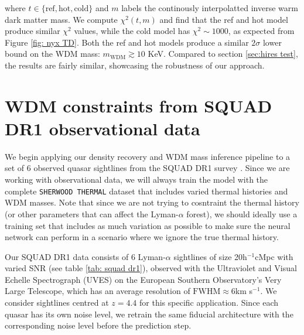 where $t\in \{\mathrm{ref}, \mathrm{hot}, \mathrm{cold} \}$ and $m$ labels the continously interpolatted inverse warm dark matter mass. We compute $\chi^2(t,m)$ and find that the ref and hot model produce similar $\chi^2$ values, while the cold model has $\chi^2 \sim 1000$, as expected from Figure \ref{fig: nyx TD}. Both the ref and hot models produce a similar $2\sigma$ lower bound on the WDM mass: $m_{\mathrm{WDM}} \gtrsim 10$ KeV. Compared to section \ref{sec:hires test}, the results are fairly similar, showcasing the robustness of our approach.

































\section{WDM constraints from SQUAD DR1 observational data}\label{sec:inference squad}
We begin applying our density recovery and WDM mass inference pipeline to a set of 6 observed quasar sightlines from the SQUAD DR1 survey \cite{Murphy_2018}. Since we are working with observational data, we will always train the model with the complete \texttt{SHERWOOD THERMAL} dataset that includes varied thermal histories and WDM masses. Note that since we are not trying to cosntraint the thermal history (or other parameters that can affect the Lyman-$\alpha$ forest), we should ideally use a training set that includes as much variation as possible to make sure the neural network can perform in a scenario where we ignore the true thermal history.

Our SQUAD DR1  data consists of 6 Lyman-$\alpha$ sightlines of size 20h$^{-1}$cMpc with varied SNR (see table \ref{tab: squad dr1}), observed with the Ultraviolet and Visual Echelle Spectrograph (UVES) on the European Southern Observatory’s Very Large Telescope, which has an average resolution of $\mathrm{FWHM}\approx 6$km s$^{-1}$. We consider sightlines centred at $z=4.4$ for this specific application. Since each quasar has its own noise level, we retrain the same fiducial architecture with the corresponding noise level before the prediction step.

